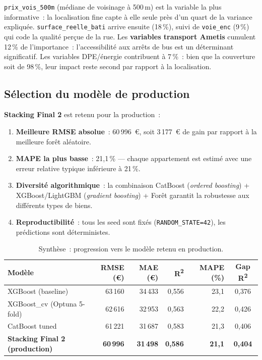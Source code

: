 \documentclass[12pt,a4paper]{article}
\begin{document}
\begin{descrbox}
\texttt{prix\_vois\_500m} (m\'ediane de voisinage \`a 500\,m) est la variable la plus informative~: la localisation fine capte \`a elle seule pr\`es d'un quart de la variance expliqu\'ee. \texttt{surface\_reelle\_bati} arrive ensuite (18\,\%), suivi de \texttt{voie\_enc} (9\,\%) qui code la qualit\'e perçue de la rue. Les \textbf{variables transport Ametis} cumulent 12\,\% de l'importance~: l'accessibilit\'e aux arr\^ets de bus est un d\'eterminant significatif. Les variables DPE/\'energie contribuent \`a 7\,\%~: bien que la couverture soit de 98\,\%, leur impact reste second par rapport \`a la localisation.
\end{descrbox}

\subsection{S\'election du mod\`ele de production}

\textbf{Stacking Final 2} est retenu pour la production~:
\begin{enumerate}
    \item \textbf{Meilleure RMSE absolue}~: 60\,996~\euro{}, soit 3\,177~\euro{} de gain par rapport \`a la meilleure for\^et al\'eatoire.
    \item \textbf{MAPE la plus basse}~: 21{,}1\,\% --- chaque appartement est estim\'e avec une erreur relative typique inf\'erieure \`a 21\,\%.
    \item \textbf{Diversit\'e algorithmique}~: la combinaison CatBoost (\textit{ordered boosting}) + XGBoost/LightGBM (\textit{gradient boosting}) + For\^et garantit la robustesse aux diff\'erents types de biens.
    \item \textbf{Reproductibilit\'e}~: tous les seed sont fix\'es (\texttt{RANDOM\_STATE=42}), les pr\'edictions sont d\'eterministes.
\end{enumerate}

\begin{table}[H]
\centering
\caption{Synth\`ese~: progression vers le mod\`ele retenu en production.}
\label{tab:progression}
\small
\begin{tabular}{lrrrrc}
\toprule
\textbf{Mod\`ele} & \textbf{RMSE (\euro)} & \textbf{MAE (\euro)} & \textbf{R\textsuperscript{2}} & \textbf{MAPE (\%)} & \textbf{Gap R\textsuperscript{2}} \\
\midrule
XGBoost (baseline) & 63\,160 & 34\,433 & 0{,}556 & 23{,}1 & 0{,}376 \\
XGBoost\_cv (Optuna 5-fold) & 62\,616 & 32\,953 & 0{,}563 & 22{,}2 & 0{,}426 \\
CatBoost tuned & 61\,221 & 31\,687 & 0{,}583 & 21{,}3 & 0{,}406 \\
\textbf{Stacking Final 2 (production)} & \textbf{60\,996} & \textbf{31\,498} & \textbf{0{,}586} & \textbf{21{,}1} & \textbf{0{,}404} \\
\bottomrule
\end{tabular}
\end{table}
\end{document}
